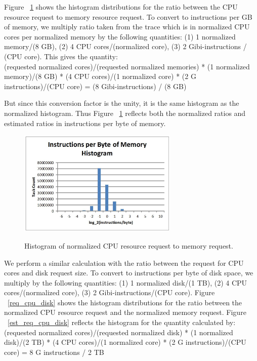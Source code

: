\documentclass{sig-alternate}
\begin{document}
Figure ~\ref{req_cpu_mem} shows the histogram distributions for the ratio between the CPU resource request to memory resource request. 
To convert to instructions per GB of memory, we multiply ratio taken from the trace which is in normalized CPU cores per normalized memory by the following quantities: (1) 1 normalized memory/(8 GB), (2) 4 CPU cores/(normalized core), (3) 2 Gibi-instructions / (CPU core).  %
This gives the quantity: \\
(requested normalized cores)/(requested normalized memories) * (1 normalized memory)/(8 GB) * (4 CPU cores)/(1 normalized core) * (2 G instructions)/(CPU core) = (8 Gibi-instructions) / (8 GB)

But since this conversion factor is the unity, it is the same histogram as the normalized histogram.
Thus Figure ~\ref{req_cpu_mem} reflects both the normalized ratios and estimated ratios in instructions per byte of memory.

\begin{figure}
\centering
\includegraphics[width=3in]{../figures/req_cpu_mem.jpg}
\label{req_cpu_mem}
\caption{Histogram of normalized CPU resource request to memory request.}
\end{figure}

We perform a similar calculation with the ratio between the request for CPU cores and disk request size.
To convert to instructions per byte of disk space, we multiply by the following quantities: (1) 1 normalized disk/(1 TB), (2) 4 CPU cores/(normalized core), (3) 2 Gibi-instructions/(CPU core).
Figure ~\ref{req_cpu_disk} shows the histogram distributions for the ratio between the normalized CPU resource request and the normalized memory request.
Figure ~\ref{est_req_cpu_disk} reflects the histogram for the quantity calculated by: \\
(requested normalized cores)/(requested normalized disk) * (1 normalized disk)/(2 TB) * (4 CPU cores)/(1 normalized core) * (2 G instructions)/(CPU core) = 8 G instructions / 2 TB
\end{document}
